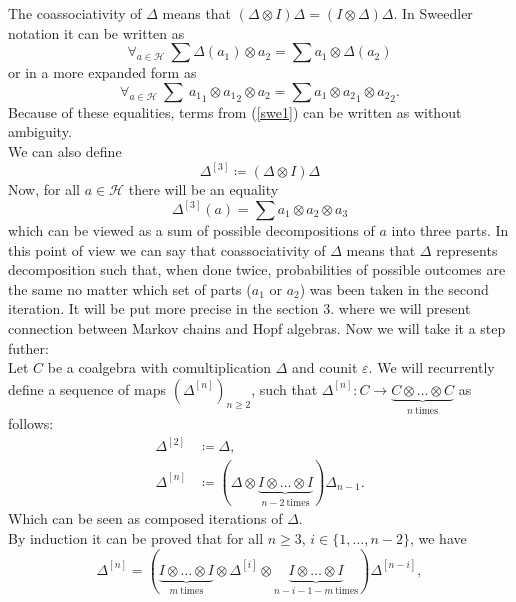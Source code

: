 \documentclass[a4paper, 12pt]{report}
\begin{document}
The coassociativity of $\Delta$ means that $(\Delta \otimes I)\Delta = (I \otimes \Delta)\Delta$.
In Sweedler notation it can be written as
\begin{equation*}
\forall_{a \in \mathcal{H}}\ \sum\Delta(a_1) \otimes a_2 = \sum a_1 \otimes \Delta(a_2)
\end{equation*}
or in a more expanded form as
\begin{equation}\label{swe1}
\forall_{a\in \mathcal{H}}\ \sum\ {a_1}_1 \otimes {a_1}_2 \otimes a_2 = \sum a_1 \otimes {a_2}_1
\otimes {a_2}_2.
\end{equation}
Because of these equalities, terms from (\ref{swe1}) can be written as
 without ambiguity. \\
We can also define
\begin{equation*}
\Delta^{[3]} \coloneqq (\Delta \otimes I)\Delta
\end{equation*}
Now, for all $a \in \mathcal{H}$ there will be an equality
\begin{equation*}
\Delta^{[3]}(a) = \sum a_1 \otimes a_2 \otimes a_3
\end{equation*}
which can be viewed as a sum of possible decompositions of $a$ into three parts.
In this point of view we can say that coassociativity of $\Delta$ means that $\Delta$ represents
decomposition such that, when done twice, probabilities of possible outcomes are the same
no matter which set of parts ($a_1$ or $a_2$) was been taken in the second iteration. It will be put more
precise in the section 3. where we will present connection between Markov chains and Hopf algebras.
Now we will take it a step futher: \\[8pt]
\indent Let $C$ be a coalgebra with comultiplication $\Delta$ and counit $\varepsilon$.
We will recurrently define a sequence of maps $(\Delta^{[n]})_{n \geq 2}$, such that
$\Delta^{[n]} : C \to \underbrace{C \otimes \dots \otimes C}_{n \mathrm{\ times}}$ as follows:
\begin{align*}
\Delta^{[2]} &\coloneqq \Delta, \\
\Delta^{[n]} &\coloneqq (\Delta \otimes
\underbrace{I \otimes \dots \otimes I}_{n - 2 \mathrm{\ times}})\Delta_{n-1}.
\end{align*}
Which can be seen as composed iterations of $\Delta$. \\
By induction it can be proved that for all $n \geq 3$, $i \in \{1, \dots, n-2\}$,
 we have
\begin{equation*}
\Delta^{[n]} = (\underbrace{I \otimes \dots \otimes I}_{m\ \mathrm{times}} \otimes
\Delta^{[i]} \otimes \underbrace{I \otimes \dots \otimes I}_{n-i-1-m \mathrm{\ times}})\Delta^{[n-i]},
\end{equation*}
\end{document}
